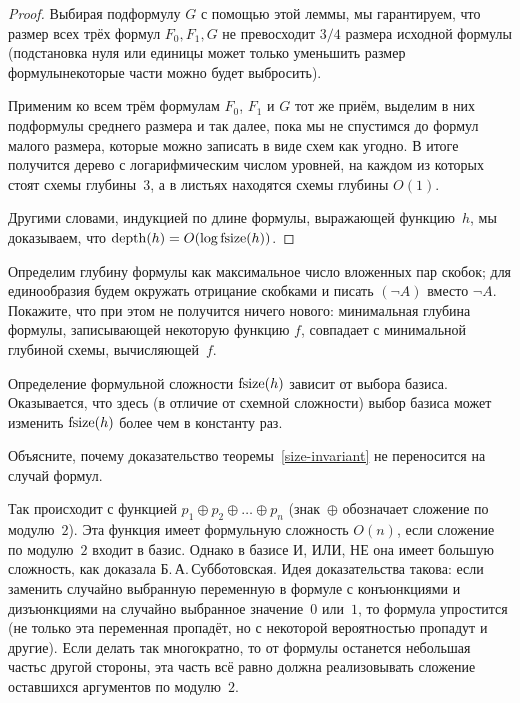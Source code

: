 \begin{proof}
Выбирая подформулу $G$ с помощью этой леммы, мы гарантируем,
что размер всех трёх формул $F_0,F_1,G$ не превосходит $3/4$
размера исходной формулы (подстановка нуля или единицы может
только уменьшить размер формулы\т некоторые части можно будет
выбросить).

Применим ко всем трём формулам $F_0$, $F_1$ и $G$ тот же приём,
выделим в них подформулы среднего размера и так далее, пока мы
не спустимся до формул малого размера, которые можно записать в
виде схем как угодно. В итоге получится дерево с логарифмическим
числом уровней, на каждом из которых стоят схемы глубины~$3$, а
в листьях находятся схемы глубины $O(1)$.

Другими словами, индукцией по длине формулы, выражающей
функцию~$h$, мы доказываем, что
$\operatorname{depth}(h)=O(\log\operatorname{fsize}(h))$.
\end{proof}

\begin{problem}
Определим глубину формулы как максимальное число вложенных
пар скобок; для единообразия будем окружать отрицание скобками
и писать $(\lnot A)$ вместо $\lnot A$. Покажите, что при этом
не получится ничего нового: минимальная глубина формулы, записывающей
некоторую функцию $f$, совпадает с минимальной глубиной схемы,
вычисляющей~$f$.
\end{problem}

Определение формульной сложности $\operatorname{fsize}(h)$ зависит от выбора базиса.
Оказывается, что здесь (в отличие от схемной сложности) выбор
базиса может изменить $\operatorname{fsize}(h)$ более чем в константу раз.

\begin{problem}
Объясните, почему доказательство теоремы~\ref{size-invariant}
не переносится на случай формул.
\end{problem}

Так происходит с функцией ${p_1\oplus
p_2\oplus\ldots\oplus p_n}$ (знак~$\oplus$ обозначает сложение по
модулю~$2$). Эта функция имеет формульную сложность $O(n)$, если
сложение по модулю~$2$ входит в базис. Однако в базисе И, ИЛИ,
НЕ она имеет большую сложность, как доказала
Б.\,А.\,Субботовская.%
Идея доказательства такова: если заменить
случайно выбранную переменную в формуле с конъюнкциями и
дизъюнкциями на случайно выбранное значение~$0$ или~$1$, то
формула упростится (не только эта переменная пропадёт, но с
некоторой вероятностью пропадут и другие). Если делать так
многократно, то от формулы останется небольшая часть\т с другой
стороны, эта часть всё равно должна реализовывать сложение
оставшихся аргументов по модулю~$2$.

